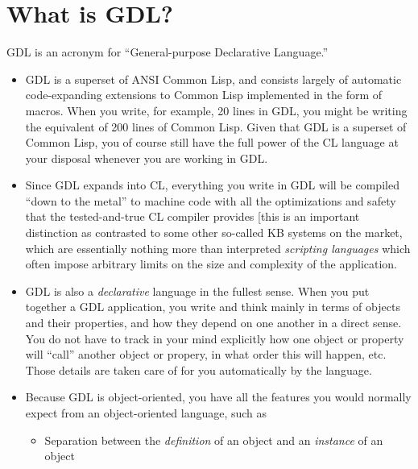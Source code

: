 \documentclass [11pt]{book}
\begin{document}
\section{What is GDL?}

\label{sec:whatisgdl?}

GDL is an acronym for
``General-purpose Declarative Language.''

\begin{itemize}

\item GDL is a superset of ANSI Common Lisp, and consists largely of
automatic code-expanding extensions to Common Lisp implemented in the
form of macros. When you write, for example, 20 lines in GDL, you
might be writing the equivalent of 200 lines of Common Lisp. Given
that GDL is a superset of Common Lisp, you of course still have the
full power of the CL language at your disposal whenever you are
working in GDL.
\item Since GDL expands into CL, everything you write in GDL will be
compiled ``down to the metal'' to machine code with all the
optimizations and safety that the tested-and-true CL compiler provides
[this is an important distinction as contrasted to some other
so-called KB systems on the market, which are essentially nothing more
than interpreted \emph{scripting languages} which often impose arbitrary limits on
the size and complexity of the application.

\item GDL is also a \emph{declarative} language in the fullest sense. When you put together a GDL application, you write and think mainly
in terms of objects and their properties, and how they depend on one another in a direct
sense. You do not have to track in your mind explicitly how one object or property will ``call''
another object or propery, in what order this will happen, etc. Those details are
taken care of for you automatically by the language.

\item Because GDL is object-oriented, you have all the features you would normally expect
from an object-oriented language, such as 

\begin{itemize}

\item Separation between the \emph{definition} of an object and an \emph{instance} of an object


\end{itemize}
\end{itemize}
\end{document}
